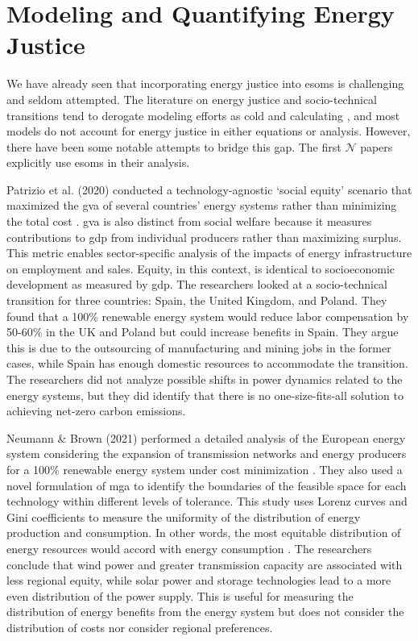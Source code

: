 \section{Modeling and Quantifying Energy Justice}

We have already seen that incorporating energy justice into \acp{esom} is 
challenging and seldom attempted. The literature on energy justice and socio-technical
transitions tend to derogate modeling efforts as cold and calculating \cite{sovacool_energy_2015,sovacool_energy_2016}, and most models do not account for energy justice in either equations or analysis. However, there have been some notable attempts to bridge this gap. The first $\mathcal{N}$ papers explicitly use \acp{esom} in their analysis.

Patrizio et al. (2020) conducted a technology-agnostic `social equity' scenario that maximized the \ac{gva} of several countries' energy systems rather than minimizing the total cost \cite{patrizio_socially_2020}. \Ac{gva} is also distinct from social welfare because it measures contributions to \ac{gdp} from individual producers rather than maximizing surplus. This metric enables sector-specific analysis of the impacts of energy infrastructure on employment and sales. Equity, in this context, is identical to socioeconomic development as measured by \ac{gdp}. The researchers looked at a socio-technical transition for three countries: Spain, the United Kingdom, and Poland. They found that 
a 100\% renewable energy system would reduce labor compensation by 50-60\% in the UK
and Poland but could increase benefits in Spain. They argue this is due to the outsourcing
of manufacturing and mining jobs in the former cases, while Spain has enough domestic 
resources to accommodate the transition. The researchers did not analyze possible shifts 
in power dynamics related to the energy systems, but they did identify that there is no
one-size-fits-all solution to achieving net-zero carbon emissions.

Neumann \& Brown (2021) performed a detailed analysis of the European energy system considering the expansion of transmission networks and energy producers for a 100\% renewable energy system under cost
minimization \cite{neumann_near-optimal_2021}. They also used a novel formulation of 
\ac{mga} to identify the boundaries of the feasible space for each technology within 
different levels of tolerance. This study uses Lorenz curves and Gini coefficients to 
measure the uniformity of the distribution of energy production and consumption. In other
words, the most equitable distribution of energy resources would accord with energy consumption \cite{neumann_near-optimal_2021}. The researchers conclude that wind power
and greater transmission capacity are associated with less regional equity, while solar
power and storage technologies lead to a more even distribution of the power supply. This
is useful for measuring the distribution of energy benefits from the energy system but 
does not consider the distribution of costs nor consider regional preferences. 

